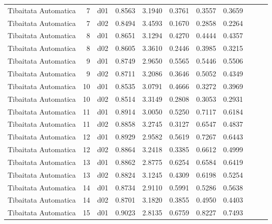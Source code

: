 \begin{landscape}
\begin{longtable}{p{2cm}rrrrrrrrrr}
    Tibaitata Automatica  &          7 &     d01 &   0.8563 &  3.1940 &        0.3761 &           0.3557 &  0.3659 \\
    Tibaitata Automatica  &          7 &     d02 &   0.8494 &  3.4593 &        0.1670 &           0.2858 &  0.2264 \\
    Tibaitata Automatica  &          8 &     d01 &   0.8651 &  3.1294 &        0.4270 &           0.4444 &  0.4357 \\
    Tibaitata Automatica  &          8 &     d02 &   0.8605 &  3.3610 &        0.2446 &           0.3985 &  0.3215 \\
    Tibaitata Automatica  &          9 &     d01 &   0.8749 &  2.9650 &        0.5565 &           0.5446 &  0.5506 \\
    Tibaitata Automatica  &          9 &     d02 &   0.8711 &  3.2086 &        0.3646 &           0.5052 &  0.4349 \\
    Tibaitata Automatica  &         10 &     d01 &   0.8535 &  3.0791 &        0.4666 &           0.3272 &  0.3969 \\
    Tibaitata Automatica  &         10 &     d02 &   0.8514 &  3.3149 &        0.2808 &           0.3053 &  0.2931 \\
    Tibaitata Automatica  &         11 &     d01 &   0.8914 &  3.0050 &        0.5250 &           0.7117 &  0.6184 \\
    Tibaitata Automatica  &         11 &     d02 &   0.8858 &  3.2745 &        0.3127 &           0.6547 &  0.4837 \\
    Tibaitata Automatica  &         12 &     d01 &   0.8929 &  2.9582 &        0.5619 &           0.7267 &  0.6443 \\
    Tibaitata Automatica  &         12 &     d02 &   0.8864 &  3.2418 &        0.3385 &           0.6612 &  0.4999 \\
    Tibaitata Automatica  &         13 &     d01 &   0.8862 &  2.8775 &        0.6254 &           0.6584 &  0.6419 \\
    Tibaitata Automatica  &         13 &     d02 &   0.8824 &  3.1245 &        0.4309 &           0.6198 &  0.5254 \\
    Tibaitata Automatica  &         14 &     d01 &   0.8734 &  2.9110 &        0.5991 &           0.5286 &  0.5638 \\
    Tibaitata Automatica  &         14 &     d02 &   0.8701 &  3.1820 &        0.3855 &           0.4950 &  0.4403 \\
    Tibaitata Automatica  &         15 &     d01 &   0.9023 &  2.8135 &        0.6759 &           0.8227 &  0.7493 \\

\end{longtable}
\end{landscape}
